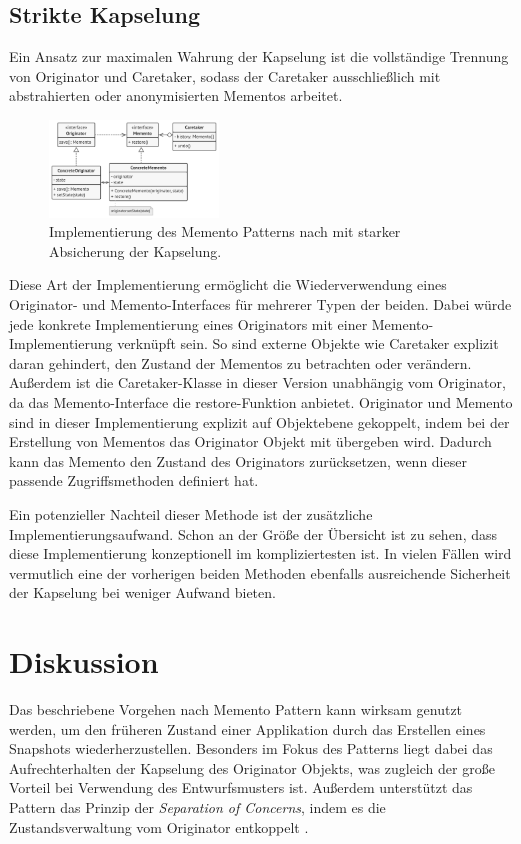 \documentclass[9pt,conference]{IEEEtran}
\begin{document}
\subsection{Strikte Kapselung}
Ein Ansatz zur maximalen Wahrung der Kapselung ist die vollständige Trennung von Originator und Caretaker, sodass der Caretaker ausschließlich mit abstrahierten oder anonymisierten Mementos arbeitet.
\begin{figure}[htbp]
	\centerline{\includegraphics[width=0.4\textwidth]{figures/strict-encapsulation.png}}
	\caption{Implementierung des Memento Patterns nach \cite{refactoring-guru} mit starker Absicherung der Kapselung.}
	\label{fig:strict-implementation}
\end{figure}
Diese Art der Implementierung ermöglicht die Wiederverwendung eines Originator- und Memento-Interfaces für mehrerer Typen der beiden.
Dabei würde jede konkrete Implementierung eines Originators mit einer Memento-Implementierung verknüpft sein.
So sind externe Objekte wie Caretaker explizit daran gehindert, den Zustand der Mementos zu betrachten oder verändern.
Außerdem ist die Caretaker-Klasse in dieser Version unabhängig vom Originator, da das Memento-Interface die restore-Funktion anbietet.
Originator und Memento sind in dieser Implementierung explizit auf Objektebene gekoppelt, indem bei der Erstellung von Mementos das Originator Objekt mit übergeben wird.
Dadurch kann das Memento den Zustand des Originators zurücksetzen, wenn dieser passende Zugriffsmethoden definiert hat.

Ein potenzieller Nachteil dieser Methode ist der zusätzliche Implementierungsaufwand.
Schon an der Größe der Übersicht ist zu sehen, dass diese Implementierung konzeptionell im kompliziertesten ist.
In vielen Fällen wird vermutlich eine der vorherigen beiden Methoden ebenfalls ausreichende Sicherheit der Kapselung bei weniger Aufwand bieten.

\section{Diskussion}

Das beschriebene Vorgehen nach Memento Pattern kann wirksam genutzt werden, um den früheren Zustand einer Applikation durch das Erstellen eines Snapshots wiederherzustellen.
Besonders im Fokus des Patterns liegt dabei das Aufrechterhalten der Kapselung des Originator Objekts, was zugleich der große Vorteil bei Verwendung des Entwurfsmusters ist.
Außerdem unterstützt das Pattern das Prinzip der \emph{Separation of Concerns}, indem es die Zustandsverwaltung vom Originator entkoppelt \cite{geeksforgeeks}.
\end{document}
